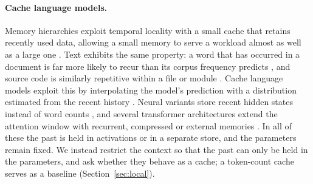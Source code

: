 \documentclass[10pt]{article}
\begin{document}
\paragraph{Cache language models.}
Memory hierarchies exploit temporal locality with a small cache that retains recently used data, allowing a small memory to serve a workload almost as well as a large one \cite{denning1968working}.
Text exhibits the same property: a word that has occurred in a document is far more likely to recur than its corpus frequency predicts \cite{church2000empirical}, and source code is similarly repetitive within a file or module \cite{tu2014localness}.
Cache language models exploit this by interpolating the model's prediction with a distribution estimated from the recent history \cite{kuhn1990cache,jelinek1991dynamic}.
Neural variants store recent hidden states instead of word counts \cite{grave2017improving,khandelwal2020generalization}, and several transformer architectures extend the attention window with recurrent, compressed or external memories \cite{dai2019transformerxl,rae2020compressive,wu2022memorizing,bulatov2022recurrent}.
In all of these the past is held in activations or in a separate store, and the parameters remain fixed.
We instead restrict the context so that the past can only be held in the parameters, and ask whether they behave as a cache; a token-count cache serves as a baseline (Section~\ref{sec:local}).
\end{document}
